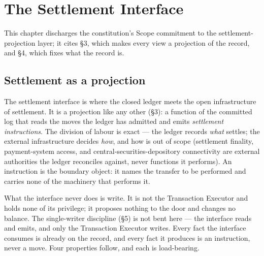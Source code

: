 
\section{The Settlement Interface}\label{ch:settlement}

This chapter discharges the constitution's Scope commitment to the
settlement-projection layer; it cites \S3, which makes every view a projection of
the record, and \S4, which fixes what the record is.

\subsection{Settlement as a projection}

The settlement interface is where the closed ledger meets the open infrastructure
of settlement. It is a projection like any other (\S3): a function of the committed
log that reads the moves the ledger has admitted and emits \emph{settlement
instructions}. The division of labour is exact --- the ledger records \emph{what}
settles; the external infrastructure decides \emph{how}, and how is out of scope
(settlement finality, payment-system access, and central-securities-depository
connectivity are external authorities the ledger reconciles against, never
functions it performs). An instruction is the boundary object: it names the
transfer to be performed and carries none of the machinery that performs it.

What the interface never does is write. It is not the Transaction Executor and
holds none of its privilege; it proposes nothing to the door and changes no
balance. The single-writer discipline (\S5) is not bent here --- the interface
reads and emits, and only the Transaction Executor writes. Every fact the interface
consumes is already on the record, and every fact it produces is an instruction,
never a move. Four properties follow, and each is load-bearing.

